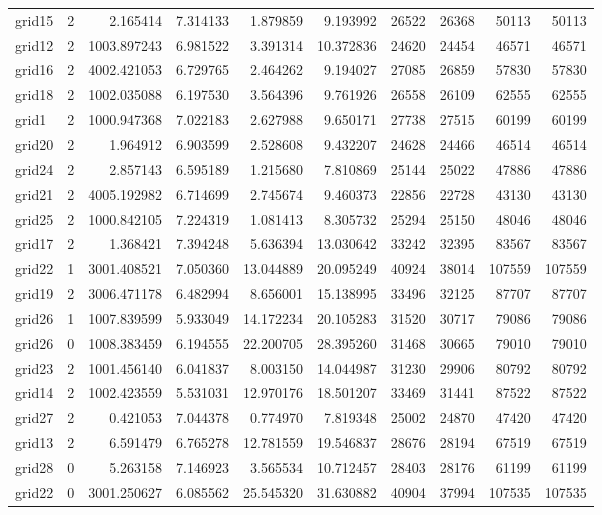 \begin{longtable}{|l|r|r|r|r|r|r|r|r|r|}
grid15 & 2 & 2.165414 & 7.314133 & 1.879859 & 9.193992 & 26522 & 26368 & 50113 & 50113 \\
grid12 & 2 & 1003.897243 & 6.981522 & 3.391314 & 10.372836 & 24620 & 24454 & 46571 & 46571 \\
grid16 & 2 & 4002.421053 & 6.729765 & 2.464262 & 9.194027 & 27085 & 26859 & 57830 & 57830 \\
grid18 & 2 & 1002.035088 & 6.197530 & 3.564396 & 9.761926 & 26558 & 26109 & 62555 & 62555 \\
grid1 & 2 & 1000.947368 & 7.022183 & 2.627988 & 9.650171 & 27738 & 27515 & 60199 & 60199 \\
grid20 & 2 & 1.964912 & 6.903599 & 2.528608 & 9.432207 & 24628 & 24466 & 46514 & 46514 \\
grid24 & 2 & 2.857143 & 6.595189 & 1.215680 & 7.810869 & 25144 & 25022 & 47886 & 47886 \\
grid21 & 2 & 4005.192982 & 6.714699 & 2.745674 & 9.460373 & 22856 & 22728 & 43130 & 43130 \\
grid25 & 2 & 1000.842105 & 7.224319 & 1.081413 & 8.305732 & 25294 & 25150 & 48046 & 48046 \\
grid17 & 2 & 1.368421 & 7.394248 & 5.636394 & 13.030642 & 33242 & 32395 & 83567 & 83567 \\
grid22 & 1 & 3001.408521 & 7.050360 & 13.044889 & 20.095249 & 40924 & 38014 & 107559 & 107559 \\
grid19 & 2 & 3006.471178 & 6.482994 & 8.656001 & 15.138995 & 33496 & 32125 & 87707 & 87707 \\
grid26 & 1 & 1007.839599 & 5.933049 & 14.172234 & 20.105283 & 31520 & 30717 & 79086 & 79086 \\
grid26 & 0 & 1008.383459 & 6.194555 & 22.200705 & 28.395260 & 31468 & 30665 & 79010 & 79010 \\
grid23 & 2 & 1001.456140 & 6.041837 & 8.003150 & 14.044987 & 31230 & 29906 & 80792 & 80792 \\
grid14 & 2 & 1002.423559 & 5.531031 & 12.970176 & 18.501207 & 33469 & 31441 & 87522 & 87522 \\
grid27 & 2 & 0.421053 & 7.044378 & 0.774970 & 7.819348 & 25002 & 24870 & 47420 & 47420 \\
grid13 & 2 & 6.591479 & 6.765278 & 12.781559 & 19.546837 & 28676 & 28194 & 67519 & 67519 \\
grid28 & 0 & 5.263158 & 7.146923 & 3.565534 & 10.712457 & 28403 & 28176 & 61199 & 61199 \\
grid22 & 0 & 3001.250627 & 6.085562 & 25.545320 & 31.630882 & 40904 & 37994 & 107535 & 107535 \\

\end{longtable}

